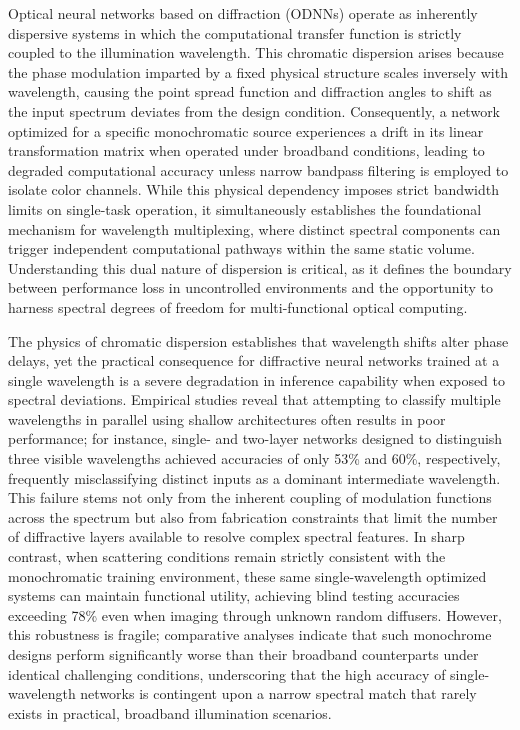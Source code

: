 \documentclass[11pt]{article}
\begin{document}
Optical neural networks based on diffraction (ODNNs) operate as inherently dispersive systems in which the computational transfer function is strictly coupled to the illumination wavelength. This chromatic dispersion arises because the phase modulation imparted by a fixed physical structure scales inversely with wavelength, causing the point spread function and diffraction angles to shift as the input spectrum deviates from the design condition. \citep{doi_10_1117_1_oe_65_5_058106_f60e3d89} Consequently, a network optimized for a specific monochromatic source experiences a drift in its linear transformation matrix when operated under broadband conditions, leading to degraded computational accuracy unless narrow bandpass filtering is employed to isolate color channels. While this physical dependency imposes strict bandwidth limits on single-task operation, it simultaneously establishes the foundational mechanism for wavelength multiplexing, where distinct spectral components can trigger independent computational pathways within the same static volume. Understanding this dual nature of dispersion is critical, as it defines the boundary between performance loss in uncontrolled environments and the opportunity to harness spectral degrees of freedom for multi-functional optical computing. \citep{doi_10_1038_s41598_018_30619_y_5f5bfb09} \citep{doi_10_3390_nano14221812_4d7d91b1} \citep{doi_10_1109_icton67126_2025_11125227_383c0a4a}

The physics of chromatic dispersion establishes that wavelength shifts alter phase delays, yet the practical consequence for diffractive neural networks trained at a single wavelength is a severe degradation in inference capability when exposed to spectral deviations. Empirical studies reveal that attempting to classify multiple wavelengths in parallel using shallow architectures often results in poor performance; for instance, single- and two-layer networks designed to distinguish three visible wavelengths achieved accuracies of only 53\% and 60\%, respectively, frequently misclassifying distinct inputs as a dominant intermediate wavelength. This failure stems not only from the inherent coupling of modulation functions across the spectrum but also from fabrication constraints that limit the number of diffractive layers available to resolve complex spectral features. In sharp contrast, when scattering conditions remain strictly consistent with the monochromatic training environment, these same single-wavelength optimized systems can maintain functional utility, achieving blind testing accuracies exceeding 78\% even when imaging through unknown random diffusers. However, this robustness is fragile; comparative analyses indicate that such monochrome designs perform significantly worse than their broadband counterparts under identical challenging conditions, underscoring that the high accuracy of single-wavelength networks is contingent upon a narrow spectral match that rarely exists in practical, broadband illumination scenarios. \citep{doi_10_1002_adpr_202300310_6647aa64} \citep{doi_10_1038_s41377_023_01116_3_aba67a18}
\end{document}
